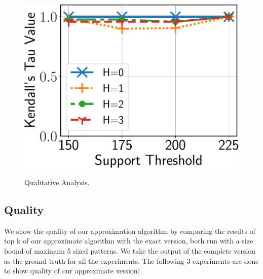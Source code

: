 \begin{figure}[t!]
{\includegraphics[keepaspectratio,scale=0.24, angle=0]{img2/citeseer/citeseer_kt.pdf}
\label{fig:citeseer_kt}
}
\vspace{-2mm}
\caption{\scriptsize Qualitative Analysis.}
\label{fig:quality}
\vspace{-2mm}
\end{figure}


\subsection{Quality}
We show the quality of our approximation algorithm by comparing the results of top k of our approximate algorithm with the exact version, both run with a size bound of maximum 5 sized patterns. We take the output of the complete version as the ground truth for all the experiments. The following 3 experiments are done to show quality of our approximate version:

